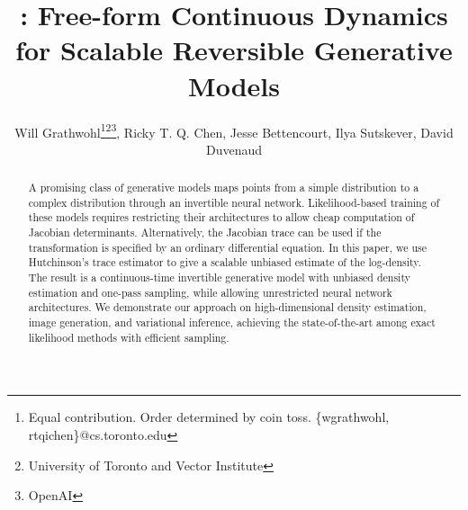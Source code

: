 \documentclass{article} %
\title{\methodname: Free-form Continuous Dynamics for Scalable Reversible Generative Models}
\author{\hspace{-1mm}Will Grathwohl\thanks{Equal contribution. Order determined by coin toss. \{wgrathwohl, rtqichen\}@cs.toronto.edu}\;\thanks{University of Toronto and Vector Institute}\;\thanks{OpenAI}\;, Ricky T. Q. Chen\samethanks[1]\;\samethanks[2]\;, Jesse Bettencourt\samethanks[2]\;, Ilya Sutskever\samethanks[3]\;, David Duvenaud\samethanks[2]
}
\newcommand{\methodname}{FFJORD\xspace}
\newcommand\0{\kern-1.2pt\vec{\kern1.2pt 0}}
\begin{document}
\maketitle

\begin{abstract}
A promising class of generative models maps points from a simple distribution to a complex distribution through an invertible neural network.
Likelihood-based training of these models requires restricting their architectures to allow cheap computation of Jacobian determinants.
Alternatively, the Jacobian trace can be used if the transformation is specified by an ordinary differential equation.
In this paper, we use Hutchinson's trace estimator to give a scalable unbiased estimate of the log-density.
The result is a continuous-time invertible generative model with unbiased density estimation and one-pass sampling, while allowing unrestricted neural network architectures.
We demonstrate our approach on high-dimensional density estimation, image generation, and variational inference, achieving the state-of-the-art among exact likelihood methods with efficient sampling.
\end{abstract}
\end{document}

